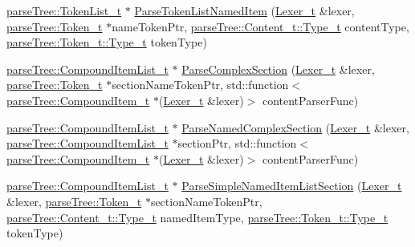 \begin{DoxyCompactItemize}
\item 
\hyperlink{structparse_tree_1_1_token_list__t}{parse\+Tree\+::\+Token\+List\+\_\+t} $\ast$ \hyperlink{namespaceparser_a503314ed4869a32da34bde0153b33495}{Parse\+Token\+List\+Named\+Item} (\hyperlink{classparser_1_1_lexer__t}{Lexer\+\_\+t} \&lexer, \hyperlink{structparse_tree_1_1_token__t}{parse\+Tree\+::\+Token\+\_\+t} $\ast$name\+Token\+Ptr, \hyperlink{structparse_tree_1_1_content__t_a45cc4a193beac87a2045a2f6b6870d1b}{parse\+Tree\+::\+Content\+\_\+t\+::\+Type\+\_\+t} content\+Type, \hyperlink{structparse_tree_1_1_token__t_ac0e6319a9ad80509dd4aa1037ba66096}{parse\+Tree\+::\+Token\+\_\+t\+::\+Type\+\_\+t} token\+Type)
\item 
\hyperlink{structparse_tree_1_1_compound_item_list__t}{parse\+Tree\+::\+Compound\+Item\+List\+\_\+t} $\ast$ \hyperlink{namespaceparser_a238f6fbb8651dbfe15fd45dea1148ef8}{Parse\+Complex\+Section} (\hyperlink{classparser_1_1_lexer__t}{Lexer\+\_\+t} \&lexer, \hyperlink{structparse_tree_1_1_token__t}{parse\+Tree\+::\+Token\+\_\+t} $\ast$section\+Name\+Token\+Ptr, std\+::function$<$ \hyperlink{structparse_tree_1_1_compound_item__t}{parse\+Tree\+::\+Compound\+Item\+\_\+t} $\ast$(\hyperlink{classparser_1_1_lexer__t}{Lexer\+\_\+t} \&lexer)$>$ content\+Parser\+Func)
\item 
\hyperlink{structparse_tree_1_1_compound_item_list__t}{parse\+Tree\+::\+Compound\+Item\+List\+\_\+t} $\ast$ \hyperlink{namespaceparser_a5054ea5770d7fb1f19ac10f709aff9eb}{Parse\+Named\+Complex\+Section} (\hyperlink{classparser_1_1_lexer__t}{Lexer\+\_\+t} \&lexer, \hyperlink{structparse_tree_1_1_compound_item_list__t}{parse\+Tree\+::\+Compound\+Item\+List\+\_\+t} $\ast$section\+Ptr, std\+::function$<$ \hyperlink{structparse_tree_1_1_compound_item__t}{parse\+Tree\+::\+Compound\+Item\+\_\+t} $\ast$(\hyperlink{classparser_1_1_lexer__t}{Lexer\+\_\+t} \&lexer)$>$ content\+Parser\+Func)
\item 
\hyperlink{structparse_tree_1_1_compound_item_list__t}{parse\+Tree\+::\+Compound\+Item\+List\+\_\+t} $\ast$ \hyperlink{namespaceparser_a6a6512e4ce73fc46a30c12d03506b52b}{Parse\+Simple\+Named\+Item\+List\+Section} (\hyperlink{classparser_1_1_lexer__t}{Lexer\+\_\+t} \&lexer, \hyperlink{structparse_tree_1_1_token__t}{parse\+Tree\+::\+Token\+\_\+t} $\ast$section\+Name\+Token\+Ptr, \hyperlink{structparse_tree_1_1_content__t_a45cc4a193beac87a2045a2f6b6870d1b}{parse\+Tree\+::\+Content\+\_\+t\+::\+Type\+\_\+t} named\+Item\+Type, \hyperlink{structparse_tree_1_1_token__t_ac0e6319a9ad80509dd4aa1037ba66096}{parse\+Tree\+::\+Token\+\_\+t\+::\+Type\+\_\+t} token\+Type)

\end{DoxyCompactItemize}
